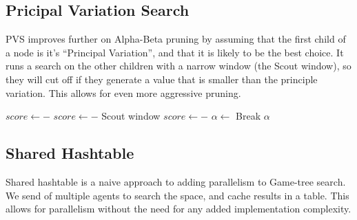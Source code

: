 \documentclass[]{article}
\begin{document}
\subsection{Pricipal Variation Search}
PVS improves further on Alpha-Beta pruning by assuming that the first child of a node
is it's ``Principal Variation'', and that it is likely to be the best choice. It runs a
search on the other children with a narrow window (the Scout window), so they will cut off if they generate
a value that is smaller than the principle variation. This allows for even more aggressive
pruning.
\begin{algorithmic}[1]
  \State \Return {}
  \Else
  \State $score \gets -$ 
  \Else
  \State $score \gets -$ 
  \Comment Scout window
  \EndIf
    \State $score \gets -$ 
  \EndIf
  \State $\alpha \gets $ 
  \If{$\alpha \geq \beta$}
  \State Break
  \EndIf
  \EndFor
  \State \Return $\alpha$
  \EndIf
  \EndProcedure
\end{algorithmic}

\subsection{Shared Hashtable}
Shared hashtable is a naive approach to adding parallelism to Game-tree search. We send of multiple agents
to search the space, and cache results in a table. This allows for parallelism without the need for any added
implementation complexity.
\end{document}
